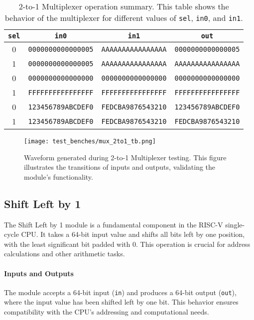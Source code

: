 \documentclass[12pt]{article}
\begin{document}
\begin{table}[ht!]
    \centering
    \renewcommand{\arraystretch}{1.1}
    \setlength{\tabcolsep}{6pt}
    \begin{tabular}{|c|c|c|c|}
        \hline
        \textbf{\texttt{sel}} & \textbf{\texttt{in0}} & \textbf{\texttt{in1}} & \textbf{\texttt{out}} \\
        \hline
        0 & \texttt{0000000000000005} & \texttt{AAAAAAAAAAAAAAAA} & \texttt{0000000000000005} \\
        1 & \texttt{0000000000000005} & \texttt{AAAAAAAAAAAAAAAA} & \texttt{AAAAAAAAAAAAAAAA} \\
        0 & \texttt{0000000000000000} & \texttt{0000000000000000} & \texttt{0000000000000000} \\
        1 & \texttt{FFFFFFFFFFFFFFFF} & \texttt{FFFFFFFFFFFFFFFF} & \texttt{FFFFFFFFFFFFFFFF} \\
        0 & \texttt{123456789ABCDEF0} & \texttt{FEDCBA9876543210} & \texttt{123456789ABCDEF0} \\
        1 & \texttt{123456789ABCDEF0} & \texttt{FEDCBA9876543210} & \texttt{FEDCBA9876543210} \\
        \hline
    \end{tabular}
    \caption{2-to-1 Multiplexer operation summary. This table shows the behavior of the multiplexer for different values of \texttt{sel}, \texttt{in0}, and \texttt{in1}.}
    \label{tab:mux_2to1_results}
\end{table}

\begin{figure}[ht!]
    \centering
    \texttt{[image: test\_benches/mux\_2to1\_tb.png]}
    \caption{Waveform generated during 2-to-1 Multiplexer testing. This figure illustrates the transitions of inputs and outputs, validating the module's functionality.}
    \label{fig:mux_2to1_waveform}
\end{figure}

\subsection*{Shift Left by 1}

The Shift Left by 1 module is a fundamental component in the RISC-V single-cycle CPU. It takes a 64-bit input value and shifts all bits left by one position, with the least significant bit padded with 0. This operation is crucial for address calculations and other arithmetic tasks.

\paragraph{Inputs and Outputs}
The module accepts a 64-bit input (\texttt{in}) and produces a 64-bit output (\texttt{out}), where the input value has been shifted left by one bit. This behavior ensures compatibility with the CPU's addressing and computational needs.
\end{document}
